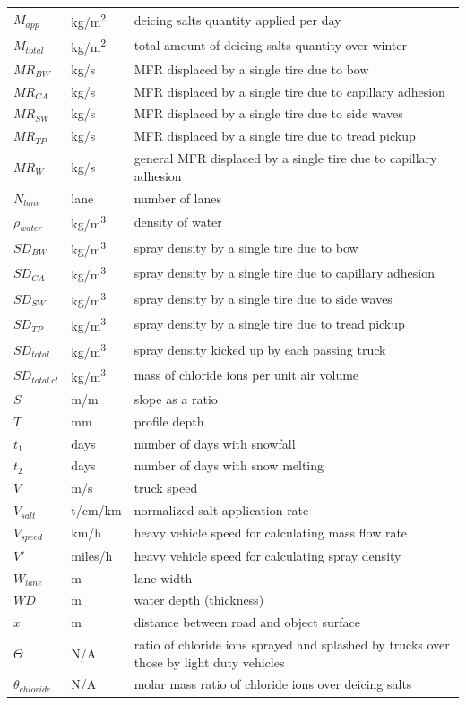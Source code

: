 \documentclass[12pt]{article}
\begin{document}
\begin{longtable*}{l l p{12cm}}
$M_{app}$ & \si{kg/m^2} & deicing salts quantity applied per day\\
$M_{total}$ & \si{kg/m^2} & total amount of deicing salts quantity over winter\\
$\mathit{MR_{BW}}$ & \si{kg/s} & MFR displaced by a single tire due to bow\\
$\mathit{MR_{CA}}$ & \si{kg/s} & MFR displaced by a single tire due to capillary adhesion\\
$\mathit{MR_{SW}}$ & \si{kg/s} & MFR displaced by a single tire due to side waves\\
$\mathit{MR_{TP}}$ & \si{kg/s} & MFR displaced by a single tire due to tread pickup\\
$\mathit{MR_{W}}$ & \si{kg/s} & general MFR displaced by a single tire due to capillary adhesion\\
$N_{lane}$ & lane & number of lanes\\
$\rho_{water}$ & \si{kg/m^{3}} & density of water\\
$\mathit{SD_{BW}}$ & \si{kg/m^{3}} & spray density by a single tire due to bow\\
$\mathit{SD_{CA}}$ & \si{kg/m^{3}} & spray density by a single tire due to capillary adhesion\\
$\mathit{SD_{SW}}$ & \si{kg/m^{3}} & spray density by a single tire due to side waves\\
$\mathit{SD_{TP}}$ & \si{kg/m^{3}} & spray density by a single tire due to tread pickup\\
$\mathit{SD_{total}}$ & \si{kg/m^{3}} & spray density kicked up by each passing truck\\
$\mathit{SD_{total~cl}}$ & \si{kg/m^3} & mass of chloride ions per unit air volume\\
$S$ & \si{m/m} & slope as a ratio\\
$T$ & \si{mm} & profile depth\\
$t_1$ & days & number of days with snowfall\\
$t_2$ & days & number of days with snow melting\\
$V$ & \si{m/s} & truck speed\\
$V_{salt}$ & \si{t/cm/km} & normalized salt application rate\\
$V_{speed}$ & \si{km/h} & heavy vehicle speed for calculating mass flow rate\\
$V'$ & \si{miles/h} & heavy vehicle speed for calculating spray density\\ %
$W_{lane}$ & \si{m} & lane width\\
$\mathit{WD}$ & \si{m} & water depth (thickness)\\
$x$ & \si{m} & distance between road and object surface\\
$\Theta$ & N/A & ratio of chloride ions sprayed and splashed by trucks over those by light duty vehicles\\
$\theta_{chloride}$ & N/A & molar mass ratio of chloride ions over deicing salts\\
\bottomrule
\end{longtable*}
\end{document}
